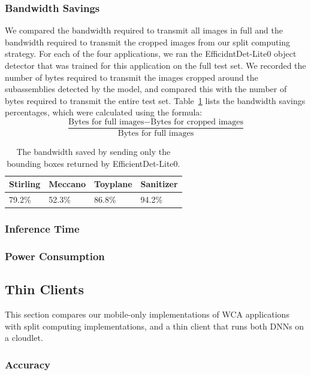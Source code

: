 \subsubsection{Bandwidth Savings}

We compared the bandwidth required to transmit all images in full and the
bandwidth required to transmit the cropped images from our split computing
strategy.
For each of the four applications, we ran the EfficidntDet-Lite0 object detector
that was trained for this application on the full test set.
We recorded the number of bytes required to transmit the images cropped around
the subassemblies detected by the model, and compared this with the number of
bytes required to transmit the entire test set.
Table~\ref{tab:bandwidth} lists the bandwidth savings percentages, which were
calculated using the formula:
\[
  \frac{\text{Bytes for full images} - \text{Bytes for cropped images}}{
    \text{Bytes for full images}}
\]

\begin{table}
  \begin{tabular}{|l|l|l|l|}
  \hline
  Stirling & Meccano & Toyplane & Sanitizer\\
  \hline
  \hline
  79.2\% & 52.3\% & 86.8\% & 94.2\%\\
  \hline
\end{tabular}
\caption{
  The bandwidth saved by sending only the bounding boxes returned by
  EfficientDet-Lite0.
}\label{tab:bandwidth}
\end{table}

\subsubsection{Inference Time}

\subsubsection{Power Consumption}

\subsection{Thin Clients}

This section compares our mobile-only implementations of WCA applications with
split computing implementations, and a thin client that runs both DNNs on a
cloudlet.

\subsubsection{Accuracy}

